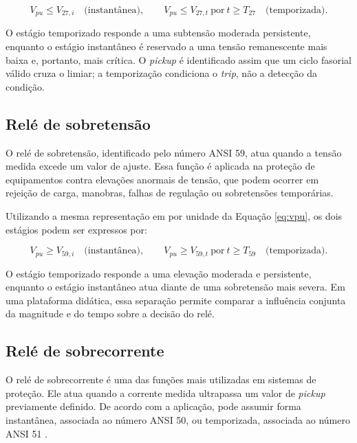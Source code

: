 \begin{equation}
  V_{pu} \leq V_{27,i}\quad\text{(instantânea)},\qquad
  V_{pu} \leq V_{27,t}\ \text{por}\ t\geq T_{27}\quad\text{(temporizada)}.
  \label{eq:subtensao}
\end{equation}

O estágio temporizado responde a uma subtensão moderada persistente, enquanto o estágio instantâneo é reservado a uma tensão remanescente mais baixa e, portanto, mais crítica. O \textit{pickup} é identificado assim que um ciclo fasorial válido cruza o limiar; a temporização condiciona o \textit{trip}, não a detecção da condição.

\subsection{Relé de sobretensão}

O relé de sobretensão, identificado pelo número ANSI 59, atua quando a tensão medida excede um valor de ajuste. Essa função é aplicada na proteção de equipamentos contra elevações anormais de tensão, que podem ocorrer em rejeição de carga, manobras, falhas de regulação ou sobretensões temporárias.

Utilizando a mesma representação em por unidade da Equação \ref{eq:vpu}, os dois estágios podem ser expressos por:

\begin{equation}
  V_{pu} \geq V_{59,i}\quad\text{(instantânea)},\qquad
  V_{pu} \geq V_{59,t}\ \text{por}\ t\geq T_{59}\quad\text{(temporizada)}.
  \label{eq:sobretensao}
\end{equation}

O estágio temporizado responde a uma elevação moderada e persistente, enquanto o estágio instantâneo atua diante de uma sobretensão mais severa. Em uma plataforma didática, essa separação permite comparar a influência conjunta da magnitude e do tempo sobre a decisão do relé.

\subsection{Relé de sobrecorrente}

O relé de sobrecorrente é uma das funções mais utilizadas em sistemas de proteção. Ele atua quando a corrente medida ultrapassa um valor de \textit{pickup} previamente definido. De acordo com a aplicação, pode assumir forma instantânea, associada ao número ANSI 50, ou temporizada, associada ao número ANSI 51 \cite{blackburn2006protective,ieee_c37_2_2022}.

